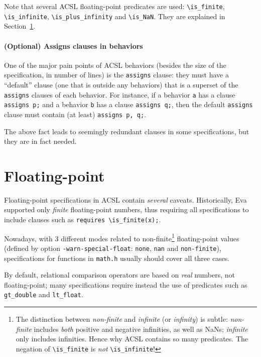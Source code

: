 \documentclass[web]{frama-c-book}
\newcommand{\Eva}{\textsf{Eva}}
\begin{document}
Note that several ACSL floating-point predicates are used: \verb+\is_finite+,
\verb+\is_infinite+, \verb+\is_plus_infinity+ and \verb+\is_NaN+. They are
explained in Section~\ref{sec:acsl-guide-float}.

\paragraph{(Optional) Assigns clauses in behaviors}

One of the major pain points of ACSL behaviors (besides the size of the
specification, in number of lines) is the \texttt{assigns} clause:
they must have a ``default'' clause (one that is outside any behaviors)
that is a superset of the \texttt{assigns} clauses of each behavior.
For instance, if a behavior \texttt{a} has a clause \verb+assigns p;+
and a behavior \texttt{b} has a clause \verb+assigns q;+, then the
default \texttt{assigns} clause must contain (at least)
\verb+assigns p, q;+.

The above fact leads to seemingly redundant clauses in some specifications,
but they are in fact needed.

\section{Floating-point}
\label{sec:acsl-guide-float}

Floating-point specifications in ACSL contain {\em several} caveats.
Historically, \Eva{} supported only {\em finite} floating-point numbers,
thus requiring all specifications to include clauses such as
\verb+requires \is_finite(x);+.

Nowadays, with 3 different modes related to non-finite\footnote{%
The distinction between {\em non-finite} and {\em infinite}
(or {\em infinity}) is subtle: {\em non-finite} includes {\em both}
positive and negative infinities, as well as NaNs; {\em infinite} only
includes infinities. Hence why ACSL contains so many predicates.
The negation of \texttt{\textbackslash{}is\_finite} is {\em not}
\texttt{\textbackslash{}is\_infinite}!}
floating-point values (defined by option \texttt{-warn-special-float}:
\texttt{none}, \texttt{nan} and \texttt{non-finite}), specifications for
functions in \texttt{math.h} usually should cover all three cases.

By default, relational comparison operators are based on {\em real} numbers,
not floating-point; many specifications require instead the use of
predicates such as \verb+gt_double+ and \verb+lt_float+.
\end{document}

